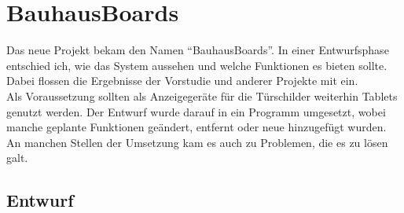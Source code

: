 \chapter{BauhausBoards}\label{BauhausBoards}
Das neue Projekt bekam den Namen ``BauhausBoards''.
In einer Entwurfsphase entschied ich, wie das System aussehen und welche Funktionen es bieten sollte. Dabei flossen die Ergebnisse der Vorstudie und anderer Projekte mit ein.
\\
Als Voraussetzung sollten als Anzeigegeräte für die Türschilder weiterhin Tablets genutzt werden.
Der Entwurf wurde darauf in ein Programm umgesetzt, wobei manche geplante Funktionen geändert, entfernt oder neue hinzugefügt wurden. An manchen Stellen der Umsetzung kam es auch zu Problemen, die es zu lösen galt.










\section{Entwurf}\label{Entwurf}
